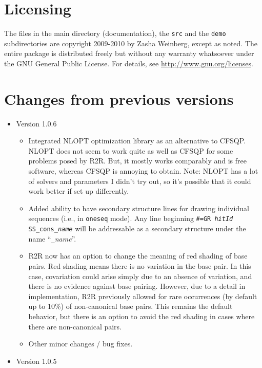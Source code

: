 \documentclass[letterpaper,12pt]{report}
\begin{document}
\section{Licensing}

The files in the main directory (documentation), the {\tt src} and the {\tt demo}
subdirectories are copyright 2009-2010 by 
Zasha Weinberg, except as noted.  The entire package is distributed freely but without any warranty whatsoever
under the GNU General Public License.
For details, see \url{http://www.gnu.org/licenses}.

\section{Changes from previous versions}

\begin{itemize}
\item Version 1.0.6
  \begin{itemize}
  \item Integrated NLOPT optimization library as an alternative to CFSQP.  NLOPT does not seem to work quite as well as CFSQP for some problems posed by R2R.  But, it mostly works comparably and is free software, whereas CFSQP is annoying to obtain.  Note: NLOPT has a lot of solvers and parameters I didn't try out, so it's possible that it could work better if set up differently.
  \item Added ability to have secondary structure lines for drawing individual sequences (i.e., in {\tt oneseq} mode).  Any line beginning {\tt \#=GR {\it hitId} SS\_cons\_{\it name}} will be addressable as a secondary structure under the name ``{\tt \_}{\it name}''.
  \item R2R now has an option to change the meaning of red shading of base pairs.  Red shading means there is no variation in the base pair.  In this case, covariation could arise simply due to an absence of variation, and there is no evidence against base pairing.  However, due to a detail in implementation, R2R previously allowed for rare occurrences (by default up to 10\%) of non-canonical base pairs.  This remains the default behavior, but there is an option to avoid the red shading in cases where there are non-canonical pairs.
  \item Other minor changes / bug fixes.
  \end{itemize}
\item Version 1.0.5
  \begin{itemize}

\end{itemize}
\end{itemize}
\end{document}
